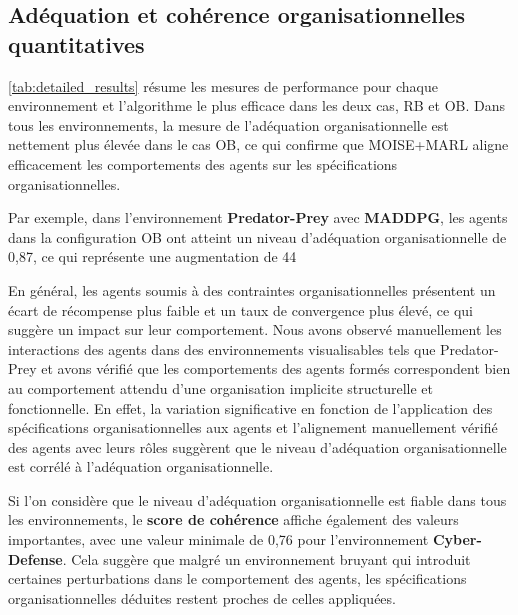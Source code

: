 \subsection{Adéquation et cohérence organisationnelles quantitatives}

\autoref{tab:detailed_results} résume les mesures de performance pour chaque environnement et l'algorithme le plus efficace dans les deux cas, RB et OB. Dans tous les environnements, la mesure de l'adéquation organisationnelle est nettement plus élevée dans le cas OB, ce qui confirme que MOISE+MARL aligne efficacement les comportements des agents sur les spécifications organisationnelles.

Par exemple, dans l'environnement \textbf{Predator-Prey} avec \textbf{MADDPG}, les agents dans la configuration OB ont atteint un niveau d'adéquation organisationnelle de 0,87, ce qui représente une augmentation de 44 %

En général, les agents soumis à des contraintes organisationnelles présentent un écart de récompense plus faible et un taux de convergence plus élevé, ce qui suggère un impact sur leur comportement. Nous avons observé manuellement les interactions des agents dans des environnements visualisables tels que Predator-Prey et avons vérifié que les comportements des agents formés correspondent bien au comportement attendu d'une organisation implicite structurelle et fonctionnelle.
%
En effet, la variation significative en fonction de l'application des spécifications organisationnelles aux agents et l'alignement manuellement vérifié des agents avec leurs rôles suggèrent que le niveau d'adéquation organisationnelle est corrélé à l'adéquation organisationnelle.

Si l'on considère que le niveau d'adéquation organisationnelle est fiable dans tous les environnements, le \textbf{score de cohérence} affiche également des valeurs importantes, avec une valeur minimale de 0,76 pour l'environnement \textbf{Cyber-Defense}. Cela suggère que malgré un environnement bruyant qui introduit certaines perturbations dans le comportement des agents, les spécifications organisationnelles déduites restent proches de celles appliquées.

